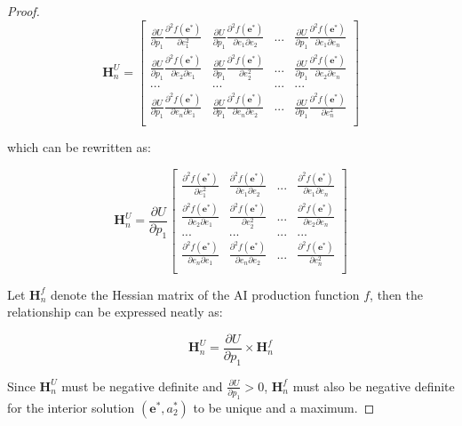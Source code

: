 \begin{proof}
$$\mathbf{H}^U_n=\begin{bmatrix}
\frac{\partial U}{\partial p_1}\frac{\partial^2 f(\mathbf{e}^*)}{\partial e_1^2} & \frac{\partial U}{\partial p_1}\frac{\partial^2 f(\mathbf{e}^*)}{\partial e_1\partial e_2} & ... & \frac{\partial U}{\partial p_1}\frac{\partial^2 f(\mathbf{e}^*)}{\partial e_1\partial e_n}\\
\frac{\partial U}{\partial p_1}\frac{\partial^2 f(\mathbf{e}^*)}{\partial e_2\partial e_1} & \frac{\partial U}{\partial p_1}\frac{\partial^2 f(\mathbf{e}^*)}{\partial e_2^2} & ... & \frac{\partial U}{\partial p_1}\frac{\partial^2 f(\mathbf{e}^*)}{\partial e_2\partial e_n}\\
... & ... & ... & ...\\
\frac{\partial U}{\partial p_1}\frac{\partial^2 f(\mathbf{e}^*)}{\partial e_n\partial e_1} & \frac{\partial U}{\partial p_1}\frac{\partial^2 f(\mathbf{e}^*)}{\partial e_n\partial e_2} & ... & \frac{\partial U}{\partial p_1}\frac{\partial^2 f(\mathbf{e}^*)}{\partial e_n^2}\\
\end{bmatrix}$$

which can be rewritten as:

$$\mathbf{H}^U_n=\frac{\partial U}{\partial p_1}\begin{bmatrix}
\frac{\partial^2 f(\mathbf{e}^*)}{\partial e_1^2} & \frac{\partial^2 f(\mathbf{e}^*)}{\partial e_1\partial e_2} & ... & \frac{\partial^2 f(\mathbf{e}^*)}{\partial e_1\partial e_n}\\
\frac{\partial^2 f(\mathbf{e}^*)}{\partial e_2\partial e_1} & \frac{\partial^2 f(\mathbf{e}^*)}{\partial e_2^2} & ... & \frac{\partial^2 f(\mathbf{e}^*)}{\partial e_2\partial e_n}\\
... & ... & ... & ...\\
\frac{\partial^2 f(\mathbf{e}^*)}{\partial e_n\partial e_1} & \frac{\partial^2 f(\mathbf{e}^*)}{\partial e_n\partial e_2} & ... & \frac{\partial^2 f(\mathbf{e}^*)}{\partial e_n^2}\\
\end{bmatrix}$$

Let $\mathbf{H}^f_n$ denote the Hessian matrix of the AI production function $f$, then the relationship can be expressed neatly as:

$$\mathbf{H}^U_n=\frac{\partial U}{\partial p_1}\times\mathbf{H}^f_n$$

Since $\mathbf{H}^U_n$ must be negative definite and $\frac{\partial U}{\partial p_1}>0$, $\mathbf{H}^f_n$ must also be negative definite for the interior solution $(\mathbf{e}^*,a^*_2)$ to be unique and a maximum.
\end{proof}


